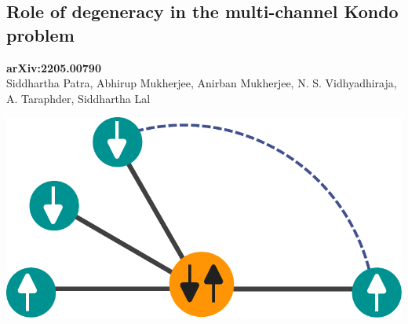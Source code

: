 \documentclass[8pt,aspectratio=169]{beamer}
\begin{document}
\begin{frame}{}
\section{Role of degeneracy in the multi-channel Kondo problem}
\begin{minipage}{0.55\textwidth}
	\small{{\bf arXiv:2205.00790}\\[10pt]
Siddhartha Patra, \alert{Abhirup Mukherjee}, Anirban Mukherjee, N. S. Vidhyadhiraja, A. Taraphder, Siddhartha Lal}
\end{minipage}
\hspace*{\fill}
\begin{minipage}{0.4\textwidth}
	\includegraphics[width=\textwidth]{stargraph.pdf}
\end{minipage}
\end{frame}
\end{document}
